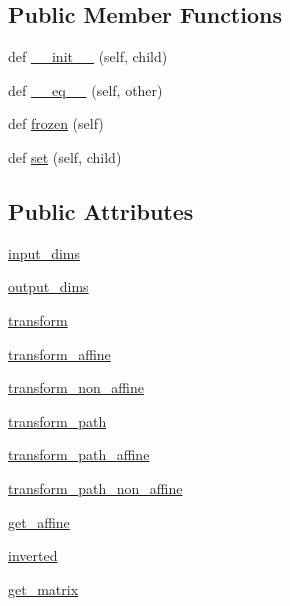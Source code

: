 \subsection*{Public Member Functions}
\begin{DoxyCompactItemize}
\item 
def \hyperlink{classmatplotlib_1_1transforms_1_1TransformWrapper_a19c4902a2a5a4721e5068c3380cf17d7}{\+\_\+\+\_\+init\+\_\+\+\_\+} (self, child)
\item 
def \hyperlink{classmatplotlib_1_1transforms_1_1TransformWrapper_aa5765250837ef9181e27dd3bee0a4cd3}{\+\_\+\+\_\+eq\+\_\+\+\_\+} (self, other)
\item 
def \hyperlink{classmatplotlib_1_1transforms_1_1TransformWrapper_a3d8be3320bfbb24a90143e00cd05770c}{frozen} (self)
\item 
def \hyperlink{classmatplotlib_1_1transforms_1_1TransformWrapper_a836772f0cb1a7f061db955939bf46941}{set} (self, child)
\end{DoxyCompactItemize}
\subsection*{Public Attributes}
\begin{DoxyCompactItemize}
\item 
\hyperlink{classmatplotlib_1_1transforms_1_1TransformWrapper_a7470b2132cf0141c5a31ff4a8c6fdd7c}{input\+\_\+dims}
\item 
\hyperlink{classmatplotlib_1_1transforms_1_1TransformWrapper_a55f55596c9576eb3550aa05ba37136d9}{output\+\_\+dims}
\item 
\hyperlink{classmatplotlib_1_1transforms_1_1TransformWrapper_a47be92fd82776aa005b0ca78668e5753}{transform}
\item 
\hyperlink{classmatplotlib_1_1transforms_1_1TransformWrapper_a98d8570736befa3209c126a3aa7a0cff}{transform\+\_\+affine}
\item 
\hyperlink{classmatplotlib_1_1transforms_1_1TransformWrapper_a4616ba51d0414568382684b14f7ca955}{transform\+\_\+non\+\_\+affine}
\item 
\hyperlink{classmatplotlib_1_1transforms_1_1TransformWrapper_ae02c2468a85493a3ceacabfaf6d1141f}{transform\+\_\+path}
\item 
\hyperlink{classmatplotlib_1_1transforms_1_1TransformWrapper_af1466a3e0958fc24ff89b6ab90944078}{transform\+\_\+path\+\_\+affine}
\item 
\hyperlink{classmatplotlib_1_1transforms_1_1TransformWrapper_a6625f5193667d1662aa846dacbdf8f57}{transform\+\_\+path\+\_\+non\+\_\+affine}
\item 
\hyperlink{classmatplotlib_1_1transforms_1_1TransformWrapper_a148a87b6ecf446d5abee4507ef544dce}{get\+\_\+affine}
\item 
\hyperlink{classmatplotlib_1_1transforms_1_1TransformWrapper_a7f8513567532cd3348192d6440be8a67}{inverted}
\item 
\hyperlink{classmatplotlib_1_1transforms_1_1TransformWrapper_aec20934b100823841cdb976ac6432f66}{get\+\_\+matrix}
\end{DoxyCompactItemize}
